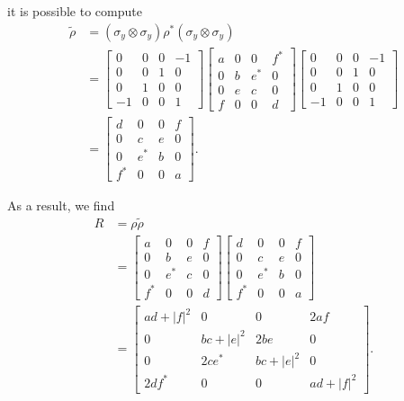 \noindent it is possible to compute
\begin{equation}
    \begin{split}
        \tilde{\rho} &= (\sigma_y \otimes \sigma_y) \rho^* (\sigma_y \otimes \sigma_y)\\
        &= \begin{bmatrix}
        0 & 0 & 0 & -1\\
        0 & 0 & 1 & 0\\
        0 & 1 & 0 & 0\\
        -1 & 0 & 0 & 1
    \end{bmatrix}
    \begin{bmatrix}
        a & 0 & 0 & f^*\\
        0 & b & e^* & 0\\
        0 & e & c & 0\\
        f & 0 & 0 & d
    \end{bmatrix}
    \begin{bmatrix}
        0 & 0 & 0 & -1\\
        0 & 0 & 1 & 0\\
        0 & 1 & 0 & 0\\
        -1 & 0 & 0 & 1
    \end{bmatrix}\\
    &= \begin{bmatrix}
        d & 0 & 0 & f\\
        0 & c & e & 0\\
        0 & e^* & b & 0\\
        f^* & 0 & 0 & a
    \end{bmatrix}.
    \end{split}
\end{equation}

\noindent As a result, we find
\begin{equation}
    \begin{split}
        R &= \rho \tilde{\rho}\\
        &= \begin{bmatrix}
        a & 0 & 0 & f\\
        0 & b & e & 0\\
        0 & e^* & c & 0\\
        f^* & 0 & 0 & d
    \end{bmatrix}
    \begin{bmatrix}
        d & 0 & 0 & f\\
        0 & c & e & 0\\
        0 & e^* & b & 0\\
        f^* & 0 & 0 & a
    \end{bmatrix}\\
    &= \begin{bmatrix}
        ad+|f|^2 & 0 & 0 & 2af\\
        0 & bc+|e|^2 & 2be & 0\\
        0 & 2ce^* & bc+|e|^2 & 0\\
        2df^* & 0 & 0 & ad+|f|^2
    \end{bmatrix}.
    \end{split}
\end{equation}

